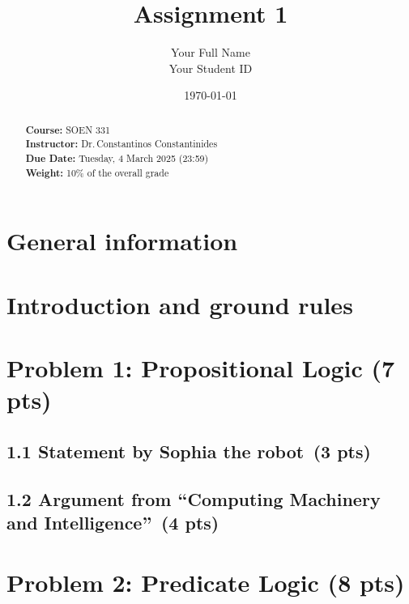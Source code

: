 \documentclass[11pt]{article}
\title{Assignment 1}
\author{Your Full Name \\
        Your Student ID}
\date{\today}
\begin{document}
\maketitle

\begin{abstract}
\noindent
\textbf{Course:} SOEN 331 \\
\textbf{Instructor:} Dr.\,Constantinos Constantinides \\
\textbf{Due Date:} Tuesday, 4 March 2025 (23:59) \\
\textbf{Weight:} 10\% of the overall grade
\end{abstract}

\vspace{1em}

\section*{General information}

\section*{Introduction and ground rules}

\newpage
\section{Problem 1: Propositional Logic (7 pts)}

\subsection*{1.1 Statement by Sophia the robot \,(3 pts)}

\subsection*{1.2 Argument from “Computing Machinery and Intelligence” \,(4 pts)}

\newpage
\section{Problem 2: Predicate Logic (8 pts)}
\end{document}
